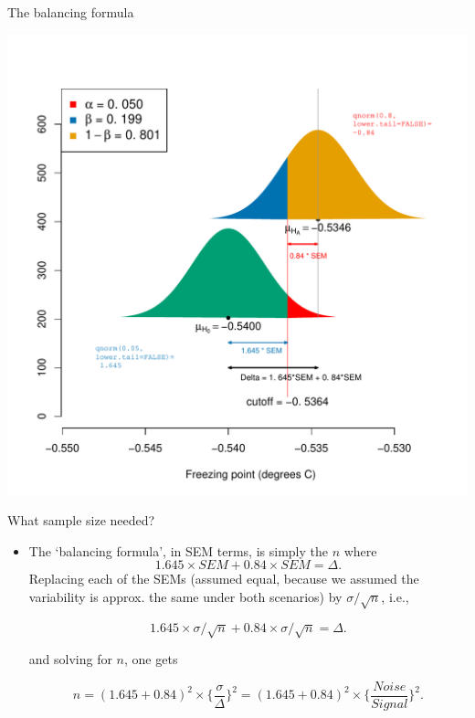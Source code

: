 \documentclass[10pt]{beamer}\usepackage[]{graphicx}\usepackage[]{color}
\makeatletter
\def\maxwidth{ %
  \ifdim\Gin@nat@width>\linewidth
    \linewidth
  \else
    \Gin@nat@width
  \fi
}
\newenvironment{knitrout}{}{} %
\makeatother
\begin{document}
\begin{frame}[fragile]{The balancing formula}
\begin{knitrout}\tiny
{}\color{fgcolor}

{\centering \includegraphics[width=\maxwidth]{figure/unnamed-chunk-15-1} 

}


\end{knitrout}
\end{frame}


\begin{frame}{What sample size needed?}
	
	\begin{itemize}
		\setlength\itemsep{1em}
		\item The `balancing formula', in SEM terms, is simply the $n$ where
		$$ 1.645 \times SEM + 0.84 \times SEM = \Delta.$$
		Replacing each of the  SEMs (assumed equal, because we assumed the variability
		is approx. the same under both scenarios) by $\sigma/\sqrt{n}$,  i.e.,
		
		$$ 1.645 \times \sigma/\sqrt{n} + 0.84 \times \sigma/\sqrt{n} = \Delta.$$
		
		and solving for $n$, one gets
		
		$$  n = (1.645 + 0.84)^2  \times \bigg\{ \frac{\sigma}{\Delta} \bigg\}^2 = 
		(1.645 + 0.84)^2  \times \bigg\{ \frac{Noise}{Signal} \bigg\}^2 .$$
	\end{itemize}
	
\end{frame}
\end{document}
